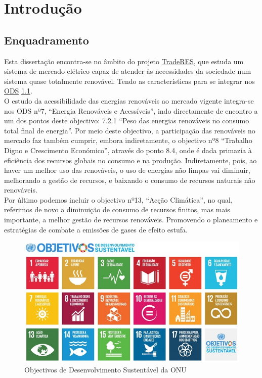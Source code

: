 \chapter{Introdução}

\section{Enquadramento \label{se:enquadramento}}
Esta dissertação encontra-se no âmbito do projeto \href{https://traderes.eu/}{TradeRES}, que estuda um sistema de mercado elétrico capaz de atender às necessidades da sociedade num sistema quase totalmente renovável. Tendo as características para se integrar nos \href{https://ods.pt/ods/}{ODS} \ref{fig:ODS}. \\
O estudo da acessibilidade das energias renováveis ao mercado vigente integra-se nos ODS nº7, “Energia Renováveis e Acessíveis”, indo directamente de encontro a um dos pontos deste objectivo: 7.2.1 “Peso das energias renováveis no consumo total final de energia”. Por meio deste objectivo, a participação das renováveis no mercado faz também cumprir, embora indiretamente, o objectivo nº8 “Trabalho Digno e Crescimento Económico”, através do ponto 8.4, onde é dada primazia à eficiência dos recursos globais no consumo e na produção. Indiretamente, pois, ao haver um melhor uso das renováveis, o uso de energias não limpas vai diminuir, melhorando a gestão de recursos, e baixando o consumo de recursos naturais não renováveis. \\
Por último podemos incluir o objectivo nº13, “Acção Climática”, no qual, referimos de novo a diminuição de consumo de recursos finitos, mas mais importante, a melhor gestão de recursos renováveis. Promovendo o planeamento e estratégias de combate a emissões de gases de efeito estufa. \\

\begin{figure}[h]
    \centering
    \includegraphics{Imagens/DesenvolvimentoSustentavel.jpg}
    \caption{Objectivos de Desenvolvimento Sustentável da ONU}
    \label{fig:ODS}
\end{figure}

